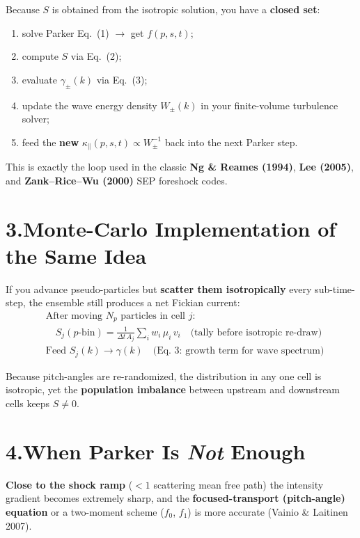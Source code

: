 Because $S$ is obtained from the isotropic solution, you have a \textbf{closed set}:
\begin{enumerate}
\item solve Parker Eq.~(1) $\rightarrow$ get $f(p,s,t)$;
\item compute $S$ via Eq.~(2);
\item evaluate $\gamma_\pm(k)$ via Eq.~(3);
\item update the wave energy density $W_\pm(k)$ in your finite-volume turbulence solver;
\item feed the \textbf{new} $\kappa_{\parallel}(p,s,t) \propto W_\pm^{-1}$ back into the next Parker step.
\end{enumerate}

\noindent
This is exactly the loop used in the classic \textbf{Ng \& Reames (1994)}, \textbf{Lee (2005)}, and \textbf{Zank–Rice–Wu (2000)} SEP foreshock codes.

\section*{3.\quad Monte-Carlo Implementation of the Same Idea}

If you advance pseudo-particles but \textbf{scatter them isotropically} every sub-time-step, the ensemble still produces a net Fickian current:
\[
\begin{aligned}
&\text{After moving } N_p \text{ particles in cell } j: \\
&\quad S_j(p\text{-bin}) = \frac{1}{\Delta t \, A_j} \sum_i w_i \, \mu_i \, v_i \quad \text{(tally before isotropic re-draw)} \\[0.5em]
&\text{Feed } S_j(k) \longrightarrow \gamma(k) \quad \text{(Eq.~3: growth term for wave spectrum)}
\end{aligned}
\]

\noindent
Because pitch-angles are re-randomized, the distribution in any one cell is isotropic, yet the \textbf{population imbalance} between upstream and downstream cells keeps $S \neq 0$.

\section*{4.\quad When Parker Is \textit{Not} Enough}

\noindent
\textbf{Close to the shock ramp} ($< 1$ scattering mean free path) the intensity gradient becomes extremely sharp, and the \textbf{focused-transport (pitch-angle) equation} or a two-moment scheme ($f_0$, $f_1$) is more accurate (Vainio \& Laitinen 2007). 

